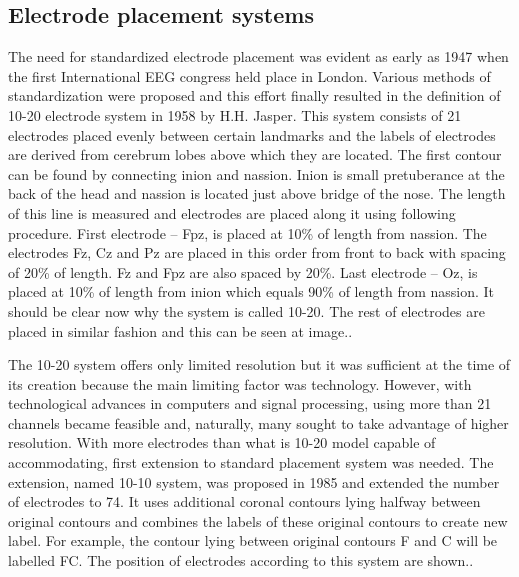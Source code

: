 \subsection{Electrode placement systems}
\label{ssec:elPlacement}
The need for standardized electrode placement was evident as early as 1947 when
the first International EEG congress held place in London. Various methods of
standardization were proposed and this effort finally resulted in the definition
of 10-20 electrode system in 1958 by H.H. Jasper. \cite{placeSys} 
This system consists of 21 electrodes placed evenly between certain landmarks
and the labels of electrodes are derived from cerebrum lobes above which they
are located. The first contour can be found by connecting inion and nassion.
Inion is small pretuberance at the back of the head and nassion is located just
above bridge of the nose. The length of this line is measured and electrodes are
placed along it using following procedure. First electrode -- Fpz, is placed at
10\% of length from nassion. The electrodes Fz, Cz and Pz are placed in this
order from front to back with spacing of 20\% of length. Fz and Fpz are also
spaced by 20\%. Last electrode -- Oz, is placed at 10\% of length from inion
which equals 90\% of length from nassion. It should be clear now why the system
is called 10-20. The rest of electrodes are placed in similar fashion and this
can be seen at image.. %

The 10-20 system offers only limited resolution but it was sufficient at the
time of its creation because the main limiting factor was technology. However,
with technological advances in computers and signal processing, using more than
21 channels became feasible and, naturally, many sought to take advantage of
higher resolution. With more electrodes than what is 10-20 model capable of
accommodating, first extension to standard placement system was needed. The
extension, named 10-10 system, was proposed in 1985 and extended the number of
electrodes to 74. It uses additional coronal contours lying halfway between
original contours and combines the labels of these original contours to create
new label. For example, the contour lying between original contours F and C will
be labelled FC. \cite{placeSys} The position of electrodes according to this
system are shown..

